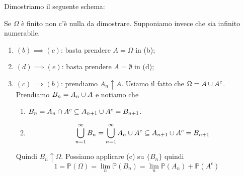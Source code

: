 \documentclass[a4paper]{article}
\begin{document}
\begin{snippetproof}{}
    Dimostriamo il seguente schema:
    \begin{center}
    \end{center}
    Se \(\Omega\) è finito non c'è nulla da dimostrare.
    Supponiamo invece che sia infinito numerabile.
    \begin{enumerate}
        \item \emph{\((b) \implies (c)\)}: basta prendere \(A = \Omega\) in (b);
        \item \emph{\((d) \implies (e)\)}: basta prendere \(A = \emptyset\) in (d);
        \item \emph{\((c) \implies (b)\)}: prendiamo \(A_n \uparrow A\).
            Usiamo il fatto che \(\Omega = A \cup A^c\).
            Prendiamo \(B_n = A_n \cup A\) e notiamo che
            \begin{enumerate}
                \item \(B_n = A_n \cap A^c \subseteq A_{n+1} \cup A^c = B_{n+1}\).
                \item \[
                        \bigcup_{n=1}^\infty B_n = \bigcup_{n=1}^\infty
                        A_n \cup A^c \subseteq A_{n+1} \cup A^c = B_{n+1}
                    \]
            \end{enumerate}
            Quindi \(B_n \uparrow \Omega\).
            Possiamo applicare (c) su \(\{B_n\}\)
            quindi \[
                1 = \mathbb P(\Omega) = \lim_n \mathbb P(B_n) = \lim_n \mathbb P(A_n) + \mathbb P(A^c)
\]
\end{enumerate}
\end{snippetproof}
\end{document}
